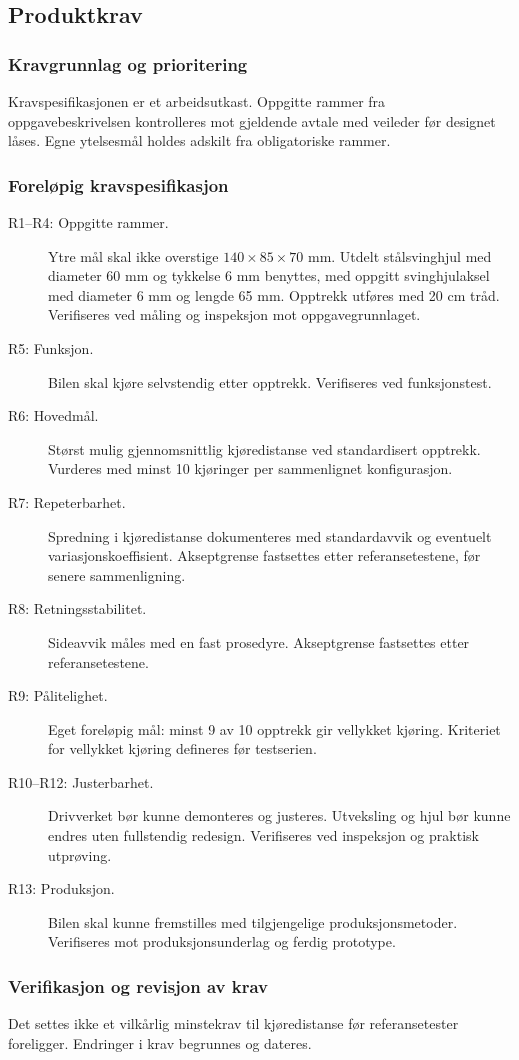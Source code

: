 \subsection{Produktkrav}
\label{sec:produktkrav}
\subsubsection{Kravgrunnlag og prioritering}
Kravspesifikasjonen er et arbeidsutkast. Oppgitte rammer fra oppgavebeskrivelsen kontrolleres mot gjeldende avtale med veileder før designet låses. Egne ytelsesmål holdes adskilt fra obligatoriske rammer.

\subsubsection{Foreløpig kravspesifikasjon}
\begin{description}
    \item[R1--R4: Oppgitte rammer.] Ytre mål skal ikke overstige $140 \times 85 \times 70$ mm. Utdelt stålsvinghjul med diameter 60 mm og tykkelse 6 mm benyttes, med oppgitt svinghjulaksel med diameter 6 mm og lengde 65 mm. Opptrekk utføres med 20 cm tråd. Verifiseres ved måling og inspeksjon mot oppgavegrunnlaget.
    \item[R5: Funksjon.] Bilen skal kjøre selvstendig etter opptrekk. Verifiseres ved funksjonstest.
    \item[R6: Hovedmål.] Størst mulig gjennomsnittlig kjøredistanse ved standardisert opptrekk. Vurderes med minst 10 kjøringer per sammenlignet konfigurasjon.
    \item[R7: Repeterbarhet.] Spredning i kjøredistanse dokumenteres med standardavvik og eventuelt variasjonskoeffisient. Akseptgrense fastsettes etter referansetestene, før senere sammenligning.
    \item[R8: Retningsstabilitet.] Sideavvik måles med en fast prosedyre. Akseptgrense fastsettes etter referansetestene.
    \item[R9: Pålitelighet.] Eget foreløpig mål: minst 9 av 10 opptrekk gir vellykket kjøring. Kriteriet for vellykket kjøring defineres før testserien.
    \item[R10--R12: Justerbarhet.] Drivverket bør kunne demonteres og justeres. Utveksling og hjul bør kunne endres uten fullstendig redesign. Verifiseres ved inspeksjon og praktisk utprøving.
    \item[R13: Produksjon.] Bilen skal kunne fremstilles med tilgjengelige produksjonsmetoder. Verifiseres mot produksjonsunderlag og ferdig prototype.
\end{description}
\subsubsection{Verifikasjon og revisjon av krav}
Det settes ikke et vilkårlig minstekrav til kjøredistanse før referansetester foreligger. Endringer i krav begrunnes og dateres.
